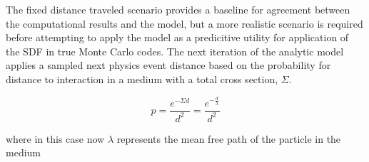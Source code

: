 


The fixed distance traveled scenario provides a baseline for agreement between
the computational results and the model, but a more realistic scenario is
required before attempting to apply the model as a predicitive utility for
application of the SDF in true Monte Carlo codes. The next iteration of the
analytic model applies a sampled next physics event distance based on the
probability for distance to interaction in a medium with a total cross section,
$\Sigma$.

\begin{equation}
  p = \frac{e^{-\Sigma d}}{d^{2}} = \frac{e^{-\frac{d}{\lambda}}}{d^{2}}
\end{equation}

where in this case now $\lambda$ represents the mean free path of the particle in the medium

